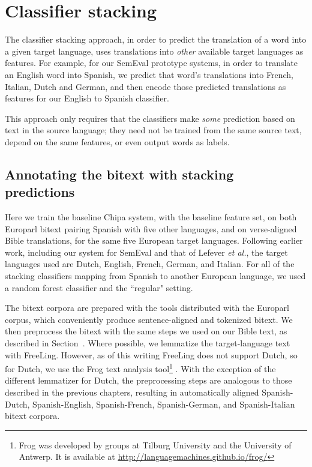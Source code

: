\section{Classifier stacking}
The classifier stacking approach, in order to predict the translation of a word
into a given target language, uses translations into \emph{other} available
target languages as features.
For example, for our SemEval prototype systems, in order to translate an
English word into Spanish, we predict that word's translations into French,
Italian, Dutch and German, and then encode those predicted translations as
features for our English to Spanish classifier.

This approach only requires that the classifiers make \emph{some} prediction
based on text in the source language; they need not be trained from the same
source text, depend on the same features, or even output words as labels.

\subsection{Annotating the bitext with stacking predictions}

Here we train the baseline Chipa system, with the baseline feature set, on both
Europarl bitext pairing Spanish with five other languages, and on verse-aligned
Bible translations, for the same five European target languages. Following
earlier work, including our system for SemEval and that of Lefever \emph{et
al.}, the target languages used are Dutch, English, French, German, and
Italian. For all of the stacking classifiers mapping from Spanish to another
European language, we used a random forest classifier and the ``regular"
setting.

The bitext corpora are prepared with the tools distributed with the Europarl
corpus, which conveniently produce sentence-aligned and tokenized bitext.  We
then preprocess the bitext with the same steps we used on our Bible text, as
described in Section~\label{sec:datasetsandpreprocessing}. Where possible, we
lemmatize the target-language text with FreeLing.  However, as of this writing
FreeLing does not support Dutch, so for Dutch, we use the Frog text analysis
tool\footnote{Frog was developed by groups at Tilburg University and the
University of Antwerp. It is available at
\url{http://languagemachines.github.io/frog/}} \cite{tadpole2007}. With the
exception of the different lemmatizer for Dutch, the preprocessing steps are
analogous to those described in the previous chapters, resulting in
automatically aligned Spanish-Dutch, Spanish-English, Spanish-French,
Spanish-German, and Spanish-Italian bitext corpora.

